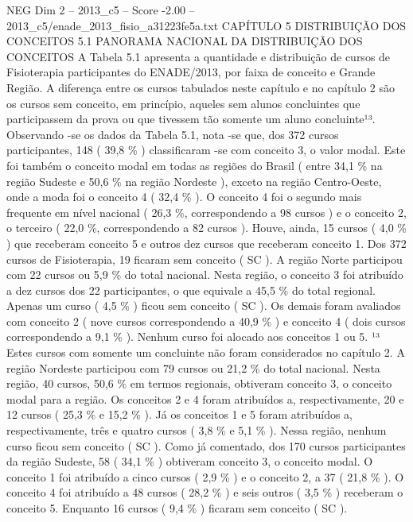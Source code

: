 \begin{textsample}{NEG Dim 2 – 2013\_c5 – Score -2.00 – 2013\_c5/enade\_2013\_fisio\_a31223fe5a.txt}  \label{ex:f2_neg_063}
CAPÍTULO 5 DISTRIBUIÇÃO DOS CONCEITOS 5.1 PANORAMA NACIONAL DA DISTRIBUIÇÃO DOS CONCEITOS A Tabela 5.1 apresenta a quantidade e distribuição de cursos de Fisioterapia participantes do ENADE/2013, por faixa de conceito e Grande Região.
A diferença entre os cursos tabulados neste capítulo e no capítulo 2 são os cursos sem conceito, em princípio, aqueles sem alunos concluintes que participassem da prova ou que tivessem tão somente um aluno concluinte¹³.
Observando -se os dados da Tabela 5.1, nota -se que, dos 372 cursos participantes, 148 ( 39,8 \% ) classificaram -se com conceito 3, o valor modal.
Este foi também o conceito modal em todas as regiões do Brasil ( entre 34,1 \% na região Sudeste e 50,6 \% na região Nordeste ), exceto na região Centro-Oeste, onde a moda foi o conceito 4 ( 32,4 \% ).
O conceito 4 foi o segundo mais frequente em nível nacional ( 26,3 \%, correspondendo a 98 cursos ) e o conceito 2, o terceiro ( 22,0 \%, correspondendo a 82 cursos ).
Houve, ainda, 15 cursos ( 4,0 \% ) que receberam conceito 5 e outros dez cursos que receberam conceito 1.
Dos 372 cursos de Fisioterapia, 19 ficaram sem conceito ( SC ).
A região Norte participou com 22 cursos ou 5,9 \% do total nacional.
Nesta região, o conceito 3 foi atribuído a dez cursos dos 22 participantes, o que equivale a 45,5 \% do total regional.
Apenas um curso ( 4,5 \% ) ficou sem conceito ( SC ).
Os demais foram avaliados com conceito 2 ( nove cursos correspondendo a 40,9 \% ) e conceito 4 ( dois cursos correspondendo a 9,1 \% ).
Nenhum curso foi alocado aos conceitos 1 ou 5. ¹³ Estes cursos com somente um concluinte não foram considerados no capítulo 2.
A região Nordeste participou com 79 cursos ou 21,2 \% do total nacional.
Nesta região, 40 cursos, 50,6 \% em termos regionais, obtiveram conceito 3, o conceito modal para a região.
Os conceitos 2 e 4 foram atribuídos a, respectivamente, 20 e 12 cursos ( 25,3 \% e 15,2 \% ).
Já os conceitos 1 e 5 foram atribuídos a, respectivamente, três e quatro cursos ( 3,8 \% e 5,1 \% ).
Nessa região, nenhum curso ficou sem conceito ( SC ).
Como já comentado, dos 170 cursos participantes da região Sudeste, 58 ( 34,1 \% ) obtiveram conceito 3, o conceito modal.
O conceito 1 foi atribuído a cinco cursos ( 2,9 \% ) e o conceito 2, a 37 ( 21,8 \% ).
O conceito 4 foi atribuído a 48 cursos ( 28,2 \% ) e seis outros ( 3,5 \% ) receberam o conceito 5.
Enquanto 16 cursos ( 9,4 \% ) ficaram sem conceito ( SC ).

\end{textsample}
